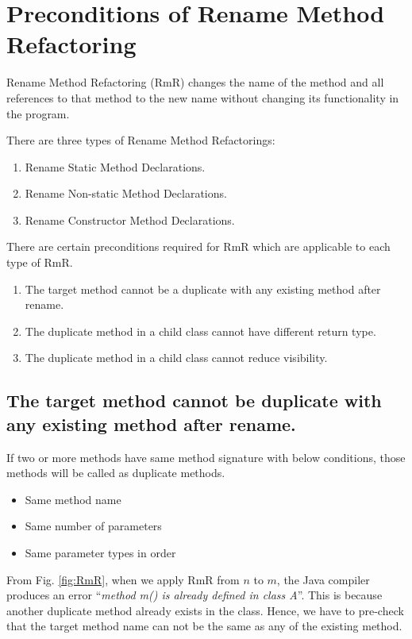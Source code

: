 \section{\textbf{Preconditions of Rename Method Refactoring}}

Rename Method Refactoring (RmR) changes the name of the method and all references to that method to the new name without changing its functionality in the program.

There are three types of Rename Method Refactorings:
\begin{enumerate}
\item Rename Static Method Declarations.
\item Rename Non-static Method Declarations.
\item Rename Constructor Method Declarations.
\end{enumerate}

There are certain preconditions required for RmR which are applicable to each type of RmR.
\begin{enumerate}
	\item The target method cannot be a duplicate with any existing method after rename.
	\item The duplicate method in a child class cannot have different return type.
	\item The duplicate method in a child class cannot reduce visibility.
\end{enumerate}

\subsection {The target method cannot be duplicate with any existing method after rename. }

If two or more methods have same method signature with
below conditions, those methods will be called as duplicate
methods.
\begin{itemize}
	\item Same method name
	\item Same number of parameters
	\item Same parameter types in order
\end{itemize}

From Fig. \ref{fig:RmR}, when we apply RmR from $n$ to $m$, the Java compiler produces an error ``\textsl{method m() is already defined in class A}''. This is because another duplicate method already exists in the class. Hence, we have to pre-check that the target method name can not be the same as any of the existing method.

